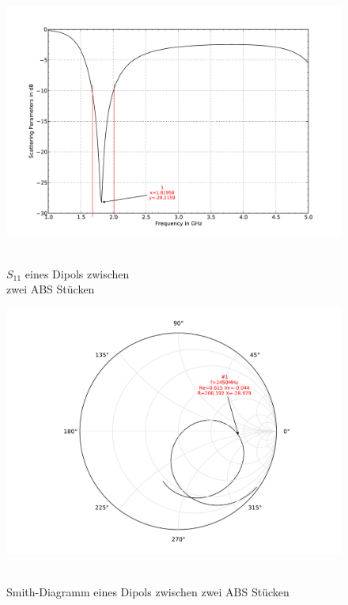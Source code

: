 \begin{figure}[!h]
\begin{center}
  \includegraphics[width=\linewidth]{content/bilder/Evaluation/Dipol/S11DipolZweiABS.pdf}
  \caption{\\$S_{11}$ eines Dipols zwischen \\zwei ABS Stücken}\label{fig:S11_Dipol_Zwei_ABS_5}
\endminipage%
{}
  \includegraphics[width=\linewidth]{content/bilder/Evaluation/Dipol/SmithDipolZweiABS.pdf}
  \caption{\\Smith-Diagramm eines Dipols zwischen zwei ABS Stücken}\label{fig:Smith_Dipol_Zwei_ABS_6}
\endminipage
\end{center}
\end{figure}

